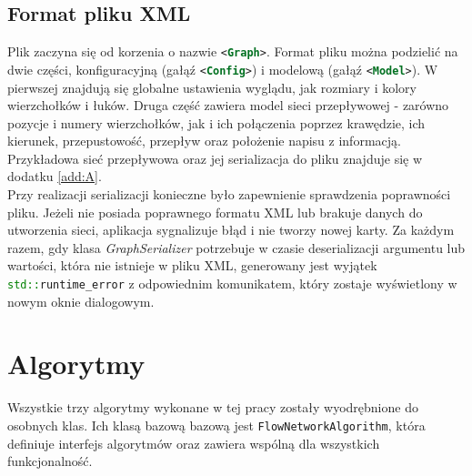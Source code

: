 \subsection{Format pliku XML}
Plik zaczyna się od korzenia o nazwie \lstinline[language=XML]|<Graph>|. Format pliku można podzielić na dwie części, konfiguracyjną (gałąź \lstinline[language=XML]|<Config>|) i modelową (gałąź \lstinline[language=XML]|<Model>|). W pierwszej znajdują się globalne ustawienia wyglądu, jak rozmiary i kolory wierzchołków i łuków. Druga część zawiera model sieci przepływowej - zarówno pozycje i numery wierzchołków, jak i ich połączenia poprzez krawędzie, ich kierunek, przepustowość, przepływ oraz położenie napisu z informacją. Przykładowa sieć przepływowa oraz jej serializacja do pliku znajduje się w dodatku \ref{add:A}.\\\indent
Przy realizacji serializacji konieczne było zapewnienie sprawdzenia poprawności pliku. Jeżeli nie posiada poprawnego formatu XML lub brakuje danych do utworzenia sieci, aplikacja sygnalizuje błąd i nie tworzy nowej karty. Za każdym razem, gdy klasa \emph{GraphSerializer} potrzebuje w czasie deserializacji argumentu lub wartości, która nie istnieje w pliku XML, generowany jest wyjątek \lstinline[language=c++]|std::runtime_error| z odpowiednim komunikatem, który zostaje wyświetlony w nowym oknie dialogowym.


\section{Algorytmy}
Wszystkie trzy algorytmy wykonane w tej pracy zostały wyodrębnione do osobnych klas. Ich klasą bazową bazową jest \lstinline|FlowNetworkAlgorithm|, która definiuje interfejs algorytmów oraz zawiera wspólną dla wszystkich funkcjonalność.
